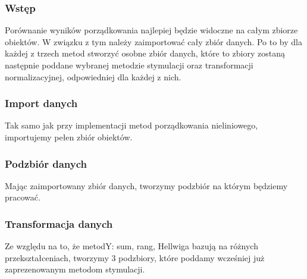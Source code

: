 \documentclass[12pt,a4paper]{report}
\begin{document}
{\subsubsection{Wstęp}\label{wstep}
Porównanie wyników porządkowania najlepiej będzie widoczne na całym zbiorze obiektów. W związku z tym należy zaimportować cały zbiór danych. Po to by dla każdej z trzech metod stworzyć osobne zbiór danych, które to zbiory zostaną następnie poddane wybranej metodzie stymulacji oraz transformacji normalizacyjnej, odpowiedniej dla każdej z nich.  

\subsubsection{Import danych}
Tak samo jak przy implementacji metod porządkowania nieliniowego, importujemy pełen zbiór obiektów.

\begin{Shaded}
\begin{Highlighting}[]
\StringTok{ }\NormalTok{(}\NormalTok{, }
                            \NormalTok{)}
\end{Highlighting}
\end{Shaded}

\subsubsection{Podzbiór danych}
Mając zaimportowany zbiór danych, tworzymy podzbiór na którym będziemy pracować. 
\begin{Shaded}
\begin{Highlighting}[]
\NormalTok{dane_porzadkowanie<-zbior_danych[}\NormalTok{(}\NormalTok{,}\NormalTok{,}\NormalTok{,}
                                   \NormalTok{,}
                                   \NormalTok{,}\NormalTok{)]}
\end{Highlighting}
\end{Shaded}

\subsubsection{Transformacja danych}
Ze względu na to, że metodY: sum, rang, Hellwiga bazują na różnych przekształceniach, tworzymy 3 podzbiory, które poddamy wcześniej już zaprezenowanym metodom stymulacji. 

}
\end{document}
